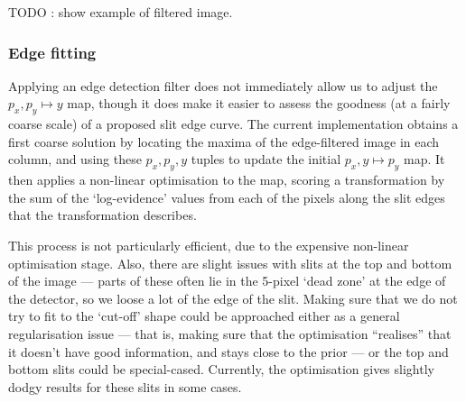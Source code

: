 TODO : show example of filtered image.

\subsubsection{Edge fitting}

Applying an edge detection filter does not immediately allow us to
adjust the $p_x, p_y \mapsto y$ map, though it does make it easier to
assess the goodness (at a fairly coarse scale) of a proposed slit edge
curve. The current implementation obtains a first coarse solution by
locating the maxima of the edge-filtered image in each column, and using
these $p_x, p_y, y$ tuples to update the initial $p_x, y \mapsto p_y$
map. It then applies a non-linear optimisation to the map, scoring a
transformation by the sum of the `log-evidence' values from each of the
pixels along the slit edges that the transformation describes.

This process is not particularly efficient, due to the expensive
non-linear optimisation stage. Also, there are slight issues with slits
at the top and bottom of the image --- parts of these often lie in the
5-pixel `dead zone' at the edge of the detector, so we loose a lot of
the edge of the slit. Making sure that we do not try to fit to the
`cut-off' shape could be approached either as a general regularisation
issue --- that is, making sure that the optimisation ``realises'' that
it doesn't have good information, and stays close to the prior ---
or the top and bottom slits could be special-cased. Currently, the
optimisation gives slightly dodgy results for these slits in some cases.

